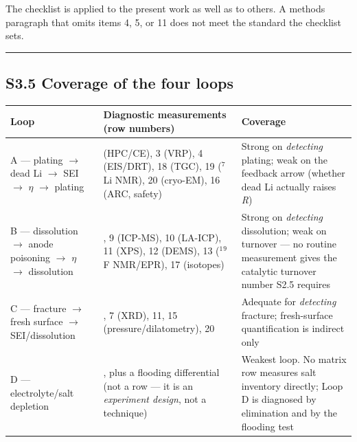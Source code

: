 \documentclass[11pt,a4paper]{article}
\renewcommand{\arraystretch}{1.15}
\begin{document}
The checklist is applied to the present work as well as to others. A methods paragraph that omits items 4, 5, or 11 does not meet the standard the checklist sets.


\par\noindent\rule{\linewidth}{0.4pt}\par


\subsection*{S3.5 Coverage of the four loops}


\begingroup\small
\setlength{\tabcolsep}{3pt}
\renewcommand{\arraystretch}{1.12}
\sloppy
\begin{tabular}{@{}>{\raggedright\arraybackslash}p{}>{\raggedright\arraybackslash}p{}>{\raggedright\arraybackslash}p{}@{}}
\hline
\textbf{Loop} & \textbf{Diagnostic measurements (row numbers)} & \textbf{Coverage} \\ \hline
A --- plating \ensuremath{\rightarrow} dead Li \ensuremath{\rightarrow} SEI \ensuremath{\rightarrow} \ensuremath{\eta} \ensuremath{\rightarrow} plating & 2 (HPC/CE), 3 (VRP), 4 (EIS/DRT), 18 (TGC), 19 (\ensuremath{^{7}}Li NMR), 20 (cryo-EM), 16 (ARC, safety) & Strong on \emph{detecting} plating; weak on the feedback arrow (whether dead Li actually raises \emph{R}) \\
\hline
B --- dissolution \ensuremath{\rightarrow} anode poisoning \ensuremath{\rightarrow} \ensuremath{\eta} \ensuremath{\rightarrow} dissolution & 4, 9 (ICP-MS), 10 (LA-ICP), 11 (XPS), 12 (DEMS), 13 (\ensuremath{^{1}}\ensuremath{^{9}}F NMR/EPR), 17 (isotopes) & Strong on \emph{detecting} dissolution; weak on turnover --- no routine measurement gives the catalytic turnover number S2.5 requires \\
\hline
C --- fracture \ensuremath{\rightarrow} fresh surface \ensuremath{\rightarrow} SEI/dissolution & 4, 7 (XRD), 11, 15 (pressure/dilatometry), 20 & Adequate for \emph{detecting} fracture; fresh-surface quantification is indirect only \\
\hline
D --- electrolyte/salt depletion & 4, plus a flooding differential (not a row --- it is an \emph{experiment design}, not a technique) & Weakest loop. No matrix row measures salt inventory directly; Loop D is diagnosed by elimination and by the flooding test \\
\hline
\end{tabular}
\endgroup
\end{document}
